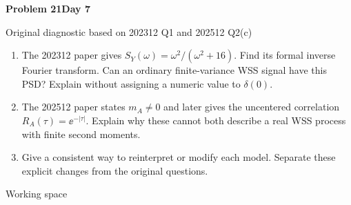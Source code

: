 \documentclass[11pt]{article}
\newcommand{\qtitle}[2]{\clearpage\begin{tcolorbox}[colback=navy,colframe=navy,arc=1.5pt,boxrule=0pt]\color{white}\large\bfseries #1\hfill\small #2\end{tcolorbox}}
\begin{document}
\qtitle{Problem 21}{Day 7}
{\small\color{accentred}Original diagnostic based on 202312 Q1 and 202512 Q2(c)}\par{}\par{}\par\smallskip\begin{tcolorbox}[colback=qbg,colframe=qbg,boxrule=0pt]\begin{enumerate}
\item The 202312 paper gives $S_Y(\omega)=\omega^2/(\omega^2+16)$. Find its formal inverse Fourier transform. Can an ordinary finite-variance WSS signal have this PSD? Explain without assigning a numeric value to $\delta(0)$.
\item The 202512 paper states $m_A\ne0$ and later gives the uncentered correlation $R_A(\tau)=\ee^{-|\tau|}$. Explain why these cannot both describe a real WSS process with finite second moments.
\item Give a consistent way to reinterpret or modify each model. Separate these explicit changes from the original questions.
\end{enumerate}\end{tcolorbox}\smallskip\begin{workspace}\hfill{\color{linec}\footnotesize Working space}\end{workspace}
\end{document}
